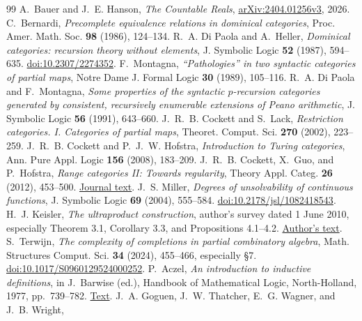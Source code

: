 \documentclass[11pt]{article}
\theoremstyle{definition}\newtheorem{definition}[theorem]{Definition}
\begin{document}
\begin{thebibliography}{99}\small
{} A.~Bauer and J.~E. Hanson, \emph{The Countable Reals}, \href{https://arxiv.org/abs/2404.01256v3}{arXiv:2404.01256v3}, 2026.
 C.~Bernardi, \emph{Precomplete equivalence relations in dominical categories}, Proc. Amer. Math. Soc. \textbf{98} (1986), 124--134.
 R.~A. Di Paola and A.~Heller, \emph{Dominical categories: recursion theory without elements}, J. Symbolic Logic \textbf{52} (1987), 594--635. \href{https://doi.org/10.2307/2274352}{doi:10.2307/2274352}.
 F.~Montagna, \emph{``Pathologies'' in two syntactic categories of partial maps}, Notre Dame J. Formal Logic \textbf{30} (1989), 105--116.
 R.~A. Di Paola and F.~Montagna, \emph{Some properties of the syntactic $p$-recursion categories generated by consistent, recursively enumerable extensions of Peano arithmetic}, J. Symbolic Logic \textbf{56} (1991), 643--660.
 J.~R.~B. Cockett and S.~Lack, \emph{Restriction categories. I. Categories of partial maps}, Theoret. Comput. Sci. \textbf{270} (2002), 223--259.
 J.~R.~B. Cockett and P.~J.~W. Hofstra, \emph{Introduction to Turing categories}, Ann. Pure Appl. Logic \textbf{156} (2008), 183--209.
 J.~R.~B. Cockett, X.~Guo, and P.~Hofstra, \emph{Range categories II: Towards regularity}, Theory Appl. Categ. \textbf{26} (2012), 453--500. \href{https://www.tac.mta.ca/tac/volumes/26/18/26-18abs.html}{Journal text}.
 J.~S. Miller, \emph{Degrees of unsolvability of continuous functions}, J. Symbolic Logic \textbf{69} (2004), 555--584. \href{https://doi.org/10.2178/jsl/1082418543}{doi:10.2178/jsl/1082418543}.
 H.~J. Keisler, \emph{The ultraproduct construction}, author's survey dated 1 June 2010, especially Theorem 3.1, Corollary 3.3, and Propositions 4.1--4.2. \href{https://people.math.wisc.edu/~hkeisler/ultraproducts-web-final.pdf}{Author's text}.
 S.~Terwijn, \emph{The complexity of completions in partial combinatory algebra}, Math. Structures Comput. Sci. \textbf{34} (2024), 455--466, especially \S7. \href{https://doi.org/10.1017/S0960129524000252}{doi:10.1017/S0960129524000252}.
P.~Aczel, \emph{An introduction to inductive definitions},
in J.~Barwise (ed.), Handbook of Mathematical Logic,
North-Holland, 1977, pp.~739--782.
\href{https://lawrencecpaulson.github.io/papers/Aczel-Inductive-Defs.pdf}{Text}.
J.~A. Goguen, J.~W. Thatcher, E.~G. Wagner, and J.~B. Wright,

\end{thebibliography}
\end{document}
